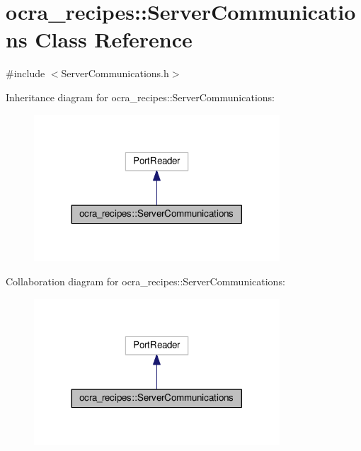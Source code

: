 \hypertarget{classocra__recipes_1_1ServerCommunications}{}\section{ocra\+\_\+recipes\+:\+:Server\+Communications Class Reference}
\label{classocra__recipes_1_1ServerCommunications}


{\ttfamily \#include $<$Server\+Communications.\+h$>$}



Inheritance diagram for ocra\+\_\+recipes\+:\+:Server\+Communications\+:
\nopagebreak
\begin{figure}[H]
\begin{center}
\leavevmode
\includegraphics[width=260pt]{d5/d38/classocra__recipes_1_1ServerCommunications__inherit__graph}
\end{center}
\end{figure}


Collaboration diagram for ocra\+\_\+recipes\+:\+:Server\+Communications\+:
\nopagebreak
\begin{figure}[H]
\begin{center}
\leavevmode
\includegraphics[width=260pt]{d6/d4b/classocra__recipes_1_1ServerCommunications__coll__graph}
\end{center}
\end{figure}
